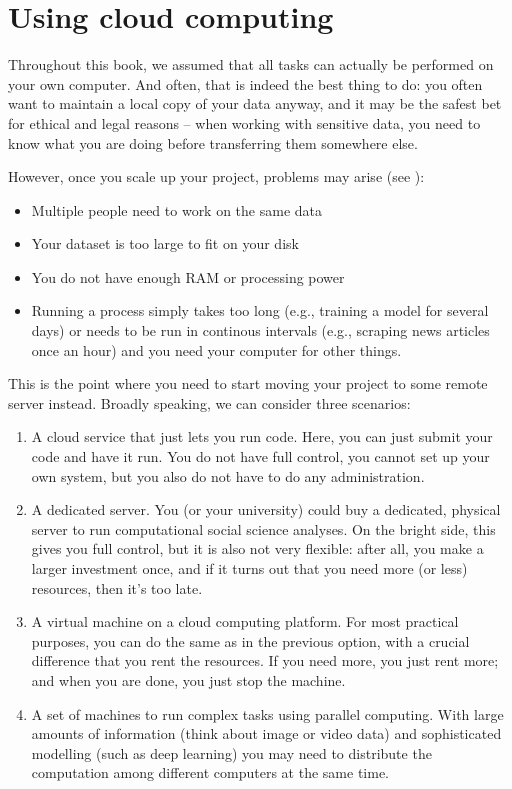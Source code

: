 \section{Using cloud computing}
\label{sec:cloudcomputing}

Throughout this book, we assumed that all tasks can actually be
performed on your own computer. And often, that is indeed the best
thing to do: you often want to maintain a local copy of your data
anyway, and it may be the safest bet for ethical and legal reasons --
when working with sensitive data, you need to know what you are doing
before transferring them somewhere else.

However, once you scale up your project, problems may arise (see \cite{Trilling2018b}):
\begin{itemize}
\item Multiple people need to work on the same data
\item Your dataset is too large to fit on your disk
\item You do not have enough RAM or processing power
\item Running a process simply takes too long (e.g., training a model
  for several days) or needs to be run in continous intervals (e.g.,
  scraping news articles once an hour) and you need your computer for
  other things.
\end{itemize}

This is the point where you need to start moving your project to some
remote server instead. Broadly speaking, we can consider three
scenarios:
\begin{enumerate}
\item A cloud service that just lets you run code. Here, you can just
  submit your code and have it run. You do not have full control, you
  cannot set up your own system, but you also do not have to do any
  administration.
\item A dedicated server. You (or your university) could buy a
  dedicated, physical server to run computational social science
  analyses. On the bright side, this gives you full control, but it is
  also not very flexible: after all, you make a larger investment
  once, and if it turns out that you need more (or less) resources,
  then it's too late.
\item A virtual machine on a cloud computing platform. For most
  practical purposes, you can do the same as in the previous option,
  with a crucial difference that you rent the resources. If you need
  more, you just rent more; and when you are done, you just stop the
  machine.
\item A set of machines to run complex tasks using parallel computing. With large amounts of information (think about image or video data) and sophisticated modelling (such as deep learning) you may need to distribute the computation among different computers at the same time.
\end{enumerate}


